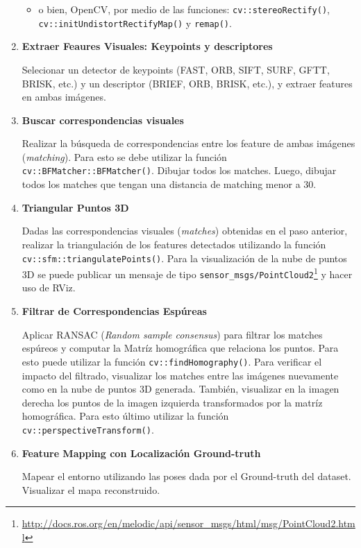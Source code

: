 \documentclass[tp]{lcc}
\begin{document}
\begin{enumerate}
\begin{itemize}
        
        \item o bien, OpenCV, por medio de las funciones: \lstinline{cv::stereoRectify()},  \lstinline{cv::initUndistortRectifyMap()} y  \lstinline{remap()}.
        
    \end{itemize}

\item \textbf{Extraer Feaures Visuales: Keypoints y descriptores}

Selecionar un detector de keypoints (FAST, ORB, SIFT, SURF, GFTT, BRISK, etc.) y un descriptor (BRIEF, ORB, BRISK, etc.), y extraer features en ambas imágenes.

\item \textbf{Buscar correspondencias visuales}

Realizar la búsqueda de correspondencias entre los feature de ambas imágenes (\emph{matching}). Para esto se debe utilizar la función \lstinline{cv::BFMatcher::BFMatcher()}. Dibujar todos los matches. Luego, dibujar todos los matches que tengan una distancia de matching menor a 30.

\item \textbf{Triangular Puntos 3D}

Dadas las correspondencias visuales (\emph{matches}) obtenidas en el paso anterior, realizar la triangulación de los features detectados utilizando la función \lstinline{cv::sfm::triangulatePoints()}. Para la visualización de la nube de puntos 3D se puede publicar un mensaje de tipo \lstinline{sensor_msgs/PointCloud2}\footnote{\url{http://docs.ros.org/en/melodic/api/sensor_msgs/html/msg/PointCloud2.html}} y hacer uso de RViz.

\item \textbf{Filtrar de Correspondencias Espúreas}

Aplicar RANSAC (\emph{Random sample consensus}) para filtrar los matches espúreos y computar la Matríz homográfica que relaciona los puntos. Para esto puede utilizar la función \lstinline{cv::findHomography()}. Para verificar el impacto del filtrado, visualizar los matches entre las imágenes nuevamente como en la nube de puntos 3D generada. También, visualizar en la imagen derecha los puntos de la imagen izquierda transformados por la matríz homográfica. Para esto último utilizar la función  \lstinline{cv::perspectiveTransform()}.

\item \textbf{Feature Mapping con Localización Ground-truth}

Mapear el entorno utilizando las poses dada por el Ground-truth del dataset. Visualizar el mapa reconstruido.


\end{enumerate}
\end{document}

